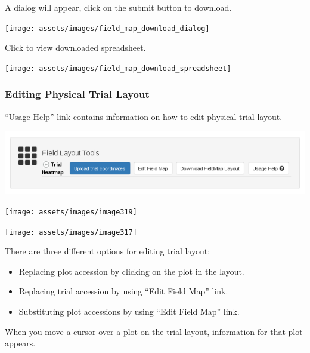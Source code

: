 \documentclass[
  12pt,
]{book}
\begin{document}
A dialog will appear, click on the submit button to download.

\begin{center}\texttt{[image: assets/images/field\_map\_download\_dialog]} \end{center}

Click to view downloaded spreadsheet.

\begin{center}\texttt{[image: assets/images/field\_map\_download\_spreadsheet]} \end{center}

\hypertarget{editing-physical-trial-layout}{%
\subsubsection*{Editing Physical Trial Layout}\label{editing-physical-trial-layout}}


``Usage Help'' link contains information on how to edit physical trial layout.

\begin{center}\includegraphics[width=0.75\linewidth]{assets/images/image332} \end{center}

\begin{center}\texttt{[image: assets/images/image319]} \end{center}

\begin{center}\texttt{[image: assets/images/image317]} \end{center}

There are three different options for editing trial layout:

\begin{itemize}
\item
  Replacing plot accession by clicking on the plot in the layout.
\item
  Replacing trial accession by using ``Edit Field Map'' link.
\item
  Substituting plot accessions by using ``Edit Field Map'' link.
\end{itemize}

When you move a cursor over a plot on the trial layout, information for that plot appears.
\end{document}

